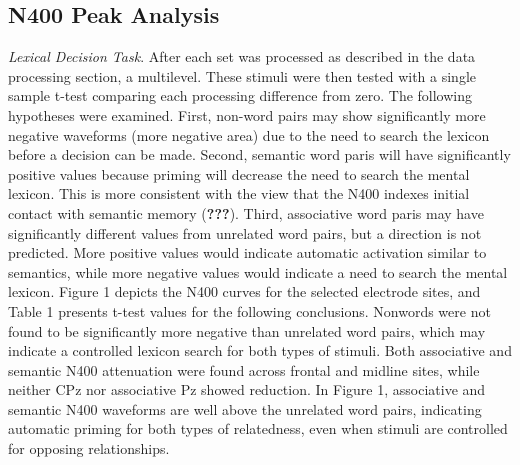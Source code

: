 \documentclass[english,man]{apa6}
\theoremstyle{definition}
\theoremstyle{definition}
\theoremstyle{definition}
\theoremstyle{remark}
\begin{document}
\subsection{N400 Peak Analysis}\label{n400-peak-analysis}

\emph{Lexical Decision Task}. After each set was processed as described
in the data processing section, a multilevel. These stimuli were then
tested with a single sample t-test comparing each processing difference
from zero. The following hypotheses were examined. First, non-word pairs
may show significantly more negative waveforms (more negative area) due
to the need to search the lexicon before a decision can be made. Second,
semantic word paris will have significantly positive values because
priming will decrease the need to search the mental lexicon. This is
more consistent with the view that the N400 indexes initial contact with
semantic memory ({\textbf{???}}). Third, associative word paris may have
significantly different values from unrelated word pairs, but a
direction is not predicted. More positive values would indicate
automatic activation similar to semantics, while more negative values
would indicate a need to search the mental lexicon. Figure 1 depicts the
N400 curves for the selected electrode sites, and Table 1 presents
t-test values for the following conclusions. Nonwords were not found to
be significantly more negative than unrelated word pairs, which may
indicate a controlled lexicon search for both types of stimuli. Both
associative and semantic N400 attenuation were found across frontal and
midline sites, while neither CPz nor associative Pz showed reduction. In
Figure 1, associative and semantic N400 waveforms are well above the
unrelated word pairs, indicating automatic priming for both types of
relatedness, even when stimuli are controlled for opposing
relationships.
\end{document}
